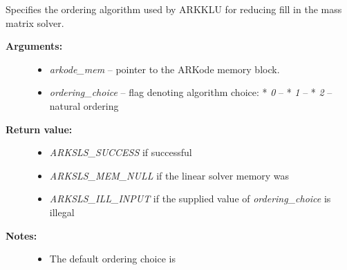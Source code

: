 \documentclass[letterpaper,10pt,english]{sphinxmanual}
\begin{document}

\begin{fulllineitems}
\label{c_interface/User_callable:ARKMassKLUSetOrdering}
Specifies the ordering algorithm used by ARKKLU for reducing fill
in the mass matrix solver.
\begin{description}
\item[{\textbf{Arguments:}}] \leavevmode\begin{itemize}
\item {} 
\emph{arkode\_mem} -- pointer to the ARKode memory block.

\item {} 
\emph{ordering\_choice} -- flag denoting algorithm choice:
* \emph{0} -- 
* \emph{1} -- 
* \emph{2} -- natural ordering

\end{itemize}

\item[{\textbf{Return value:}}] \leavevmode\begin{itemize}
\item {} 
\emph{ARKSLS\_SUCCESS}  if successful

\item {} 
\emph{ARKSLS\_MEM\_NULL} if the linear solver memory was 

\item {} 
\emph{ARKSLS\_ILL\_INPUT} if the supplied value of \emph{ordering\_choice} is illegal

\end{itemize}

\item[{\textbf{Notes:}}] \leavevmode\begin{itemize}
\item {} 
The default ordering choice is 

\end{itemize}

\end{description}

\end{fulllineitems}

\end{document}
